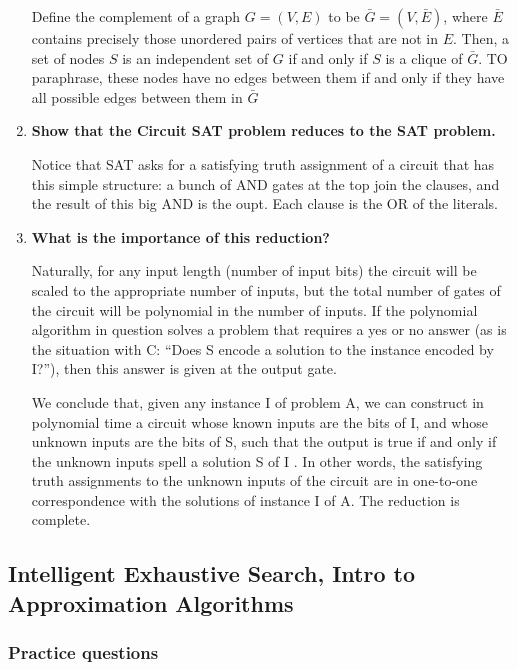 \documentclass[a4paper,11pt]{article}
\begin{document}
\begin{enumerate}
  Define the complement of a graph $G = (V, E)$ to be
  $\bar{G} = (V, \bar{E})$, where $\bar{E}$ contains precisely those
  unordered pairs of vertices that are not in $E$. Then, a set of nodes
  $S$ is an independent set of $G$ if and only if $S$ is a clique of
  $\bar{G}$. TO paraphrase, these nodes have no edges between them if
  and only if they have all possible edges between them in $\bar{G}$
\item
  \textbf{Show that the Circuit SAT problem reduces to the SAT problem.}

  Notice that SAT asks for a satisfying truth assignment of a circuit
  that has this simple structure: a bunch of AND gates at the top join
  the clauses, and the result of this big AND is the oupt. Each clause
  is the OR of the literals.
\item
  \textbf{What is the importance of this reduction?}

  Naturally, for any input length (number of input bits) the circuit
  will be scaled to the appropriate number of inputs, but the total
  number of gates of the circuit will be polynomial in the number of
  inputs. If the polynomial algorithm in question solves a problem that
  requires a yes or no answer (as is the situation with C: ``Does S
  encode a solution to the instance encoded by I?''), then this answer
  is given at the output gate.

  We conclude that, given any instance I of problem A, we can construct
  in polynomial time a circuit whose known inputs are the bits of I, and
  whose unknown inputs are the bits of S, such that the output is true
  if and only if the unknown inputs spell a solution S of I . In other
  words, the satisfying truth assignments to the unknown inputs of the
  circuit are in one-to-one correspondence with the solutions of
  instance I of A. The reduction is complete.
\end{enumerate}

\subsection{Intelligent Exhaustive Search, Intro to Approximation
Algorithms}\label{intelligent-exhaustive-search-intro-to-approximation-algorithms}

\subsubsection{Practice questions}\label{practice-questions-22}
\end{document}
